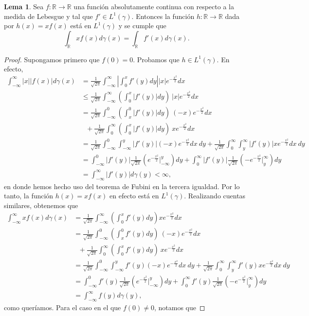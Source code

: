 \documentclass[letterpaper,twoside,12pt]{book}
\newcommand{\R}{\mathbb{R}}
\newcommand{\1}{\mathds{1}}
\newcommand{\abs}[1]{\left\lvert #1 \right\rvert}
\renewcommand{\to}{\rightarrow}
\theoremstyle{definition}
\theoremstyle{definition}
\theoremstyle{remark}
\theoremstyle{definition}
\theoremstyle{definition}
\theoremstyle{definition}
\theoremstyle{definition}
\theoremstyle{definition}
\newtheorem{lema}{Lema}
\begin{document}
\begin{lema}\label{lema1}
Sea $f:\R\to\R$ una función absolutamente continua con respecto a la medida de Lebesgue y tal que $f'\in L^{1}(\gamma)$. Entonces la función $h:\R\to\R$ dada por $h(x)=xf(x)$ está en $L^1(\gamma)$ y se cumple que 
\[
\int_\R xf(x)d\gamma(x)=\int_\R f'(x)d\gamma(x).
\]
\end{lema}
\begin{proof} 
  Supongamos primero que $f(0)=0$. Probamos que $h\in L^{1}(\gamma)$. En efecto,  
  \begin{align*}
   \int_{-\infty}^{\infty}|x||f(x)|d\gamma(x)&=\frac{1}{\sqrt{2\pi}}\int_{-\infty}^\infty\abs{\int_0^{x}f'(y)dy}|x|e^{-\frac{x^2}{2}}dx\\
   &\leq \frac{1}{\sqrt{2\pi}}\int_{-\infty}^\infty \left(\int_0^{x}\abs{f'(y)}dy\right) \ |x|e^{-\frac{x^2}{2}}dx\\
   &=\frac{1}{\sqrt{2\pi}}\int_{-\infty}^0 \left(\int_x^{0}\abs{f'(y)}dy\right) \ (-x)e^{-\frac{x^2}{2}}dx\\
   & \ \ \  +\frac{1}{\sqrt{2\pi}}\int_{0}^\infty \left(\int_0^{x}\abs{f'(y)}dy\right) \ xe^{-\frac{x^2}{2}}dx\\
   &=\frac{1}{\sqrt{2\pi}}\int_{-\infty}^0 \int_{-\infty}^{y}\abs{f'(y)}(-x)e^{-\frac{x^2}{2}}dx \ dy+\frac{1}{\sqrt{2\pi}} \int_{0}^{\infty}\int_{y}^\infty \abs{f'(y)}xe^{-\frac{x^2}{2}}dx \ dy\\
   &=\int_{-\infty}^0 \abs{f'(y)}\frac{1}{\sqrt{2\pi}}\left(e^{-\frac{x^2}{2}}\Big|_{-\infty}^{y}\right) dy + \int_{0}^{\infty}\abs{f'(y)}\frac{1}{\sqrt{2\pi}}\left(-e^{-\frac{x^2}{2}}\Big|_{y}^{\infty}\right)dy\\
   &=\int_{-\infty}^{\infty}|f'(y)|d\gamma(y)<\infty,
  \end{align*}
  en donde hemos hecho uso del teorema de Fubini en la tercera igualdad. Por lo tanto, la función $h(x)=xf(x)$ en efecto está en $L^1(\gamma)$. Realizando cuentas similares, obtenemos que 
  \begin{align*}
   \int_{-\infty}^{\infty}xf(x)d\gamma(x)&=\frac{1}{\sqrt{2\pi}}\int_{-\infty}^\infty \left(\int_0^{x}f'(y)dy\right) xe^{-\frac{x^2}{2}}dx\\
   &=\frac{1}{\sqrt{2\pi}}\int_{-\infty}^0 \left(\int_x^{0}f'(y)dy\right) \ (-x)e^{-\frac{x^2}{2}}dx\\
   & \ \ \  +\frac{1}{\sqrt{2\pi}}\int_{0}^\infty \left(\int_0^{x}f'(y) dy\right) \ xe^{-\frac{x^2}{2}}dx\\
   &=\frac{1}{\sqrt{2\pi}}\int_{-\infty}^0 \int_{-\infty}^{y}f'(y)(-x)e^{-\frac{x^2}{2}}dx\ dy+\frac{1}{\sqrt{2\pi}} \int_{0}^{\infty}\int_{y}^\infty f'(y)xe^{-\frac{x^2}{2}}dx\ dy\\
   &=\int_{-\infty}^0 f'(y)\frac{1}{\sqrt{2\pi}}\left(e^{-\frac{x^2}{2}}\Big|_{-\infty}^{y}\right) dy + \int_{0}^{\infty}f'(y)\frac{1}{\sqrt{2\pi}}\left(-e^{-\frac{x^2}{2}}\Big|_{y}^{\infty}\right)dy\\
   &=\int_{-\infty}^{\infty}f(y)d\gamma(y),
  \end{align*}
  como queríamos. Para el caso en el que $f(0)\neq 0$, notamos que 
\end{proof}
\end{document}
